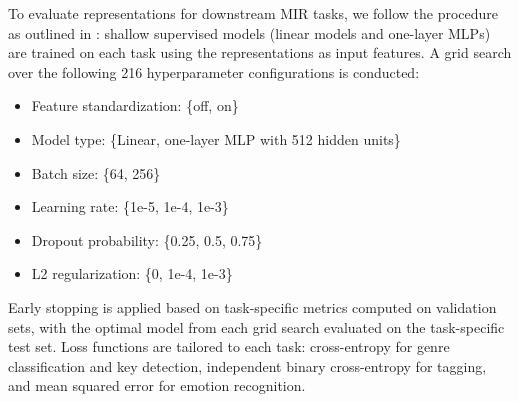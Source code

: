 To evaluate representations for downstream MIR tasks, we follow the procedure as outlined in \cite{JukeMIR}: shallow supervised models (linear models and one-layer MLPs) are trained on each task using the representations as input features. A grid search over the following 216 hyperparameter configurations is conducted:

\begin{itemize}
    \item Feature standardization: \{off, on\}
    \item Model type: \{Linear, one-layer MLP with 512 hidden units\}
    \item Batch size: \{64, 256\}
    \item Learning rate: \{1e-5, 1e-4, 1e-3\}
    \item Dropout probability: \{0.25, 0.5, 0.75\}
    \item L2 regularization: \{0, 1e-4, 1e-3\}
\end{itemize}

Early stopping is applied based on task-specific metrics computed on validation sets, with the optimal model from each grid search evaluated on the task-specific test set. Loss functions are tailored to each task: cross-entropy for genre classification and key detection, independent binary cross-entropy for tagging, and mean squared error for emotion recognition.
